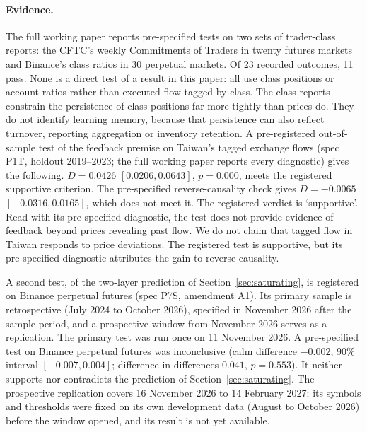 \paragraph{Evidence.} The full working paper reports pre-specified tests on two sets of trader-class reports: the CFTC's weekly Commitments of Traders in twenty futures markets and Binance's class ratios in 30 perpetual markets. Of 23 recorded outcomes, 11 pass. None is a direct test of a result in this paper: all use class positions or account ratios rather than executed flow tagged by class. The class reports constrain the persistence of class positions far more tightly than prices do. They do not identify learning memory, because that persistence can also reflect turnover, reporting aggregation or inventory retention. A pre-registered out-of-sample test of the feedback premise on Taiwan's tagged exchange flows (spec P1T, holdout 2019--2023; the full working paper reports every diagnostic) gives the following. $D=0.0426$ $[0.0206, 0.0643]$, $p=0.000$, meets the registered supportive criterion. The pre-specified reverse-causality check gives $D=-0.0065$ $[-0.0316, 0.0165]$, which does not meet it. The registered verdict is `supportive'. Read with its pre-specified diagnostic, the test does not provide evidence of feedback beyond prices revealing past flow. We do not claim that tagged flow in Taiwan responds to price deviations. The registered test is supportive, but its pre-specified diagnostic attributes the gain to reverse causality.

A second test, of the two-layer prediction of Section~\ref{sec:saturating}, is registered on Binance perpetual futures (spec P7S, amendment A1). Its primary sample is retrospective (July 2024 to October 2026), specified in November 2026 after the sample period, and a prospective window from November 2026 serves as a replication. The primary test was run once on 11 November 2026. A pre-specified test on Binance perpetual futures was inconclusive (calm difference $-0.002$, 90\% interval $[-0.007, 0.004]$; difference-in-differences $0.041$, $p=0.553$). It neither supports nor contradicts the prediction of Section~\ref{sec:saturating}. The prospective replication covers 16 November 2026 to 14 February 2027; its symbols and thresholds were fixed on its own development data (August to October 2026) before the window opened, and its result is not yet available.

